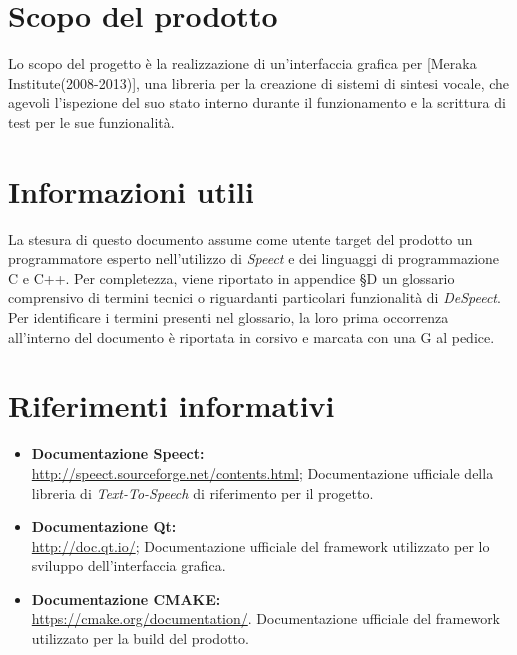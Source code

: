\documentclass[openany,12pt,a4paper]{report}
\begin{document}
	\section{Scopo del prodotto}
	
	Lo scopo del progetto è la realizzazione di un’interfaccia grafica per  [Meraka Institute(2008-2013)], una libreria per la creazione di sistemi di sintesi vocale, che agevoli l’ispezione del suo stato interno durante il funzionamento e la scrittura di test per le sue funzionalità.
	
	\section{Informazioni utili}
	
	La stesura di questo documento assume come utente target del prodotto un programmatore esperto nell'utilizzo di \textit{Speect} e dei linguaggi di programmazione C e C++.
	Per completezza, viene riportato in appendice §D un glossario comprensivo di termini tecnici o riguardanti particolari funzionalità di \textit{DeSpeect}. Per identificare i termini
	presenti nel glossario, la loro prima occorrenza all’interno del documento è riportata in corsivo e
	marcata con una G al pedice.
	
	\section{Riferimenti informativi}
	
	\begin{itemize}
		\item \textbf{Documentazione Speect:} \\
		\url{http://speect.sourceforge.net/contents.html};
		\subitem Documentazione ufficiale della libreria di \textit{Text-To-Speech} di riferimento per il progetto.
		
		\item \textbf{Documentazione Qt:} \\
		\url{http://doc.qt.io/};
		\subitem Documentazione ufficiale del framework utilizzato per lo sviluppo dell'interfaccia grafica.
		
		\item \textbf{Documentazione CMAKE:} \\
		\url{https://cmake.org/documentation/}.
		\subitem Documentazione ufficiale del framework utilizzato per la build del prodotto. 
	\end{itemize}
\end{document}
